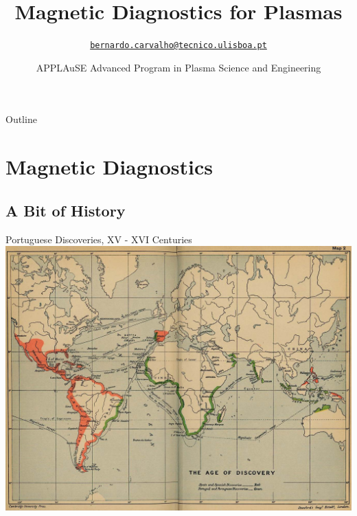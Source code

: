 \documentclass{beamer}
\title[Magnetic Diagnostics, IAEA fusion training course]{Magnetic Diagnostics for Plasmas}
\author[B.~Carvalho, 25 July 2019] %
{\href{mailto:bernardo.carvalho@tecnico.ulisboa.pt}{\nolinkurl{bernardo.carvalho@tecnico.ulisboa.pt}} }
\date[APPLAuSE 2018] %
{\small APPLAuSE Advanced Program in Plasma Science and Engineering
}
\begin{document}


\begin{frame}
\titlepage
\end{frame}

\begin{frame}{Outline}
  \tableofcontents
\end{frame}




\section{Magnetic Diagnostics}
\subsection*{A Bit of History}
\begin{frame}{Portuguese Discoveries, XV - XVI Centuries}
\includegraphics[width=8.5 cm]{discov}
\end{frame}
\end{document}
